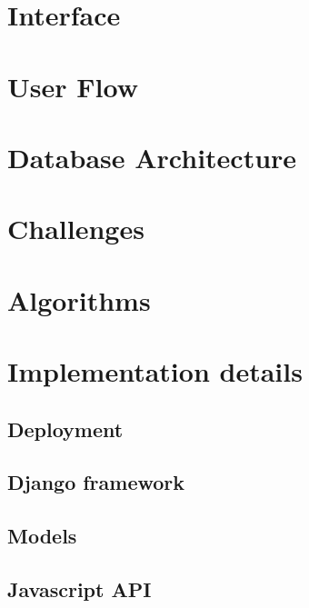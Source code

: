 \section{Interface}
\section{User Flow}
\section{Database Architecture}
\section{Challenges}
\section{Algorithms}
\section{Implementation details}
\subsection{Deployment}
\subsection{Django framework}
\subsection{Models}
\subsection{Javascript API}

